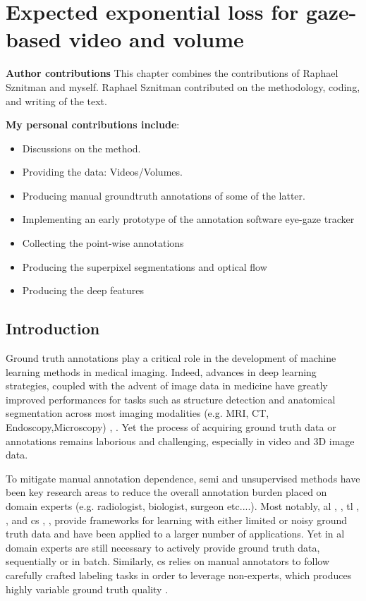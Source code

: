 \glsresetall

\chapter{Expected exponential loss for gaze-based video and volume}
\label{eel} %

\textbf{Author contributions} This chapter combines the contributions of Raphael Sznitman and myself.
Raphael Sznitman contributed on the methodology, coding, and writing of the text.

\textbf{My personal contributions include}:
\begin{itemize}
    \item Discussions on the method.
  \item Providing the data: Videos/Volumes.
    \item Producing manual groundtruth annotations of some of the latter.
    \item Implementing an early prototype of the annotation software eye-gaze tracker
    \item Collecting the point-wise annotations
    \item Producing the superpixel segmentations and optical flow
    \item Producing the deep features
\end{itemize}

\section{Introduction}
Ground truth annotations play a critical role in the development of machine learning methods in medical imaging.
Indeed, advances in deep learning strategies, coupled with the advent of
image data in medicine have greatly improved performances for tasks such as structure detection and anatomical segmentation across most imaging modalities (e.g. MRI, CT, Endoscopy,Microscopy) \cite{kamnitsas17-3d}, \cite{anthimopoulos16}.
Yet the process of acquiring ground truth data or annotations remains
laborious and challenging, especially in video and 3D image data.

To mitigate manual annotation dependence, semi and unsupervised methods have been
key research areas to reduce the overall annotation burden placed on domain experts (e.g. radiologist, biologist, surgeon etc....).
Most notably, \gls{al} \cite{KonSznFua15}, \cite{mosinska16}, \gls{tl} \cite{bermudez16}, \cite{shin16}, and \gls{cs} \cite{maier14}, \cite{cheplygina16}, provide frameworks for learning with either limited or noisy ground truth data and have been applied to a larger number of applications.
Yet in \gls{al} domain experts are still necessary to actively provide ground truth data, sequentially or in batch.
Similarly, \gls{cs} relies on manual annotators to follow carefully crafted labeling tasks in order to leverage non-experts, which produces highly variable ground truth quality \cite{cheplygina16}.

